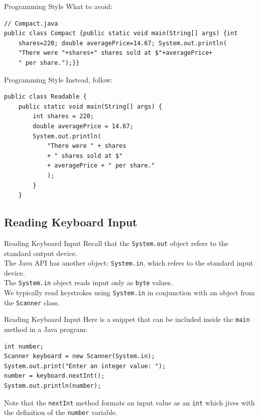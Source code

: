 \documentclass[11pt]{beamer}
\begin{document}
\begin{frame}[fragile]{Programming Style}
    What to avoid:
    \begin{lstlisting}
// Compact.java
public class Compact {public static void main(String[] args) {int
    shares=220; double averagePrice=14.67; System.out.println(
    "There were "+shares+" shares sold at $"+averagePrice+
    " per share.");}}
    \end{lstlisting}
\end{frame}

\begin{frame}[fragile]{Programming Style}
    Instead, follow:
    \begin{lstlisting}
public class Readable {
    public static void main(String[] args) {
        int shares = 220;
        double averagePrice = 14.67;
        System.out.println(
            "There were " + shares
            + " shares sold at $"
            + averagePrice + " per share."
            );
        }
    }
    \end{lstlisting}
\end{frame}

\subsection{Reading Keyboard Input}
\begin{frame}[fragile]{Reading Keyboard Input}
    Recall that the \texttt{System.out} object refers to the standard output device. \\ \vspace{1em}
    The Java API has another object: \texttt{System.in}, which refers to the standard input device. \\ \vspace{1em}
    The \texttt{System.in} object reads input only as \texttt{byte} values. \\ \vspace{1em}
    We typically read keystrokes using \texttt{System.in} in conjunction with an object from the \texttt{Scanner} class.
\end{frame}

\begin{frame}[fragile]{Reading Keyboard Input}
    Here is a snippet that can be included inside the \texttt{main} method in a Java program:
\begin{lstlisting}
int number;
Scanner keyboard = new Scanner(System.in);
System.out.print("Enter an integer value: ");
number = keyboard.nextInt();
System.out.println(number);
\end{lstlisting}
Note that the \texttt{nextInt} method formats an input value as an \texttt{int} which jives with the definition of the \texttt{number} variable.
\end{frame}
\end{document}

